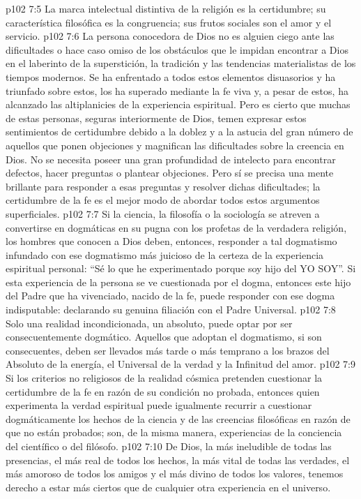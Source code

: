 \vs p102 7:5 La marca intelectual distintiva de la religión es la certidumbre; su característica filosófica es la congruencia; sus frutos sociales son el amor y el servicio.
\vs p102 7:6 \pc La persona conocedora de Dios no es alguien ciego ante las dificultades o hace caso omiso de los obstáculos que le impidan encontrar a Dios en el laberinto de la superstición, la tradición y las tendencias materialistas de los tiempos modernos. Se ha enfrentado a todos estos elementos disuasorios y ha triunfado sobre estos, los ha superado mediante la fe viva y, a pesar de estos, ha alcanzado las altiplanicies de la experiencia espiritual. Pero es cierto que muchas de estas personas, seguras interiormente de Dios, temen expresar estos sentimientos de certidumbre debido a la doblez y a la astucia del gran número de aquellos que ponen objeciones y magnifican las dificultades sobre la creencia en Dios. No se necesita poseer una gran profundidad de intelecto para encontrar defectos, hacer preguntas o plantear objeciones. Pero sí se precisa una mente brillante para responder a esas preguntas y resolver dichas dificultades; la certidumbre de la fe es el mejor modo de abordar todos estos argumentos superficiales.
\vs p102 7:7 \pc Si la ciencia, la filosofía o la sociología se atreven a convertirse en dogmáticas en su pugna con los profetas de la verdadera religión, los hombres que conocen a Dios deben, entonces, responder a tal dogmatismo infundado con ese dogmatismo más juicioso de la certeza de la experiencia espiritual personal: “Sé lo que he experimentado porque soy hijo del YO SOY”. Si esta experiencia de la persona se ve cuestionada por el dogma, entonces este hijo del Padre que ha vivenciado, nacido de la fe, puede responder con ese dogma indisputable: declarando su genuina filiación con el Padre Universal.
\vs p102 7:8 Solo una realidad incondicionada, un absoluto, puede optar por ser consecuentemente dogmático. Aquellos que adoptan el dogmatismo, si son consecuentes, deben ser llevados más tarde o más temprano a los brazos del Absoluto de la energía, el Universal de la verdad y la Infinitud del amor.
\vs p102 7:9 Si los criterios no religiosos de la realidad cósmica pretenden cuestionar la certidumbre de la fe en razón de su condición no probada, entonces quien experimenta la verdad espiritual puede igualmente recurrir a cuestionar dogmáticamente los hechos de la ciencia y de las creencias filosóficas en razón de que no están probados; son, de la misma manera, experiencias de la conciencia del científico o del filósofo.
\vs p102 7:10 \pc De Dios, la más ineludible de todas las presencias, el más real de todos los hechos, la más vital de todas las verdades, el más amoroso de todos los amigos y el más divino de todos los valores, tenemos derecho a estar más ciertos que de cualquier otra experiencia en el universo.
